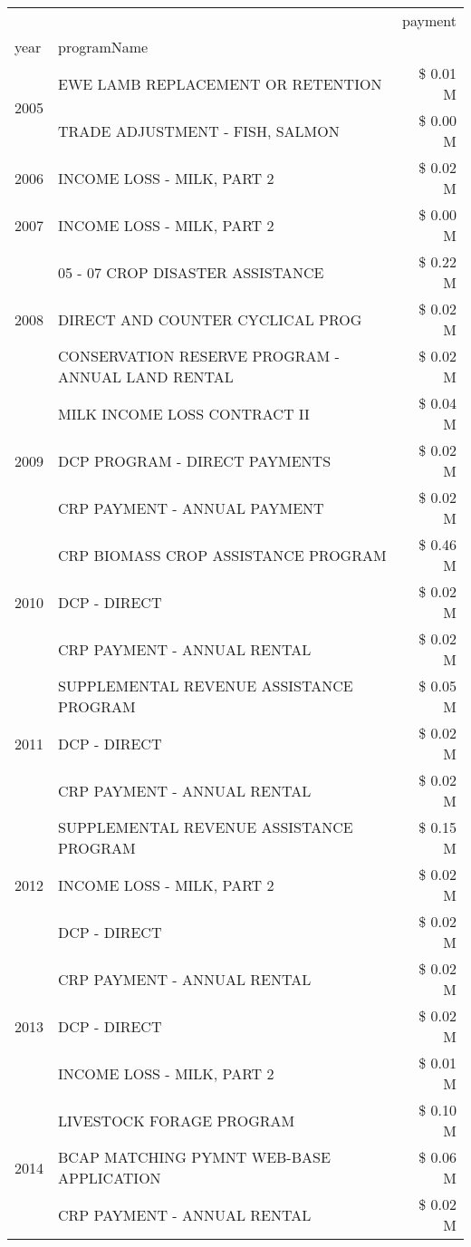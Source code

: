 \begin{tabular}{llr}
\toprule
 &  & payment \\
year & programName &  \\
\midrule
\multirow[t]{2}{*}{2005} & EWE LAMB REPLACEMENT OR RETENTION & \$ 0.01 M \\
 & TRADE ADJUSTMENT - FISH, SALMON & \$ 0.00 M \\
\cline{1-3}
2006 & INCOME LOSS - MILK, PART 2 & \$ 0.02 M \\
\cline{1-3}
2007 & INCOME LOSS - MILK, PART 2 & \$ 0.00 M \\
\cline{1-3}
\multirow[t]{3}{*}{2008} & 05 - 07 CROP DISASTER ASSISTANCE & \$ 0.22 M \\
 & DIRECT AND COUNTER CYCLICAL PROG & \$ 0.02 M \\
 & CONSERVATION RESERVE PROGRAM - ANNUAL LAND RENTAL & \$ 0.02 M \\
\cline{1-3}
\multirow[t]{3}{*}{2009} & MILK INCOME LOSS CONTRACT II & \$ 0.04 M \\
 & DCP PROGRAM - DIRECT PAYMENTS & \$ 0.02 M \\
 & CRP PAYMENT - ANNUAL PAYMENT & \$ 0.02 M \\
\cline{1-3}
\multirow[t]{3}{*}{2010} & CRP BIOMASS CROP ASSISTANCE PROGRAM & \$ 0.46 M \\
 & DCP - DIRECT & \$ 0.02 M \\
 & CRP PAYMENT - ANNUAL RENTAL & \$ 0.02 M \\
\cline{1-3}
\multirow[t]{3}{*}{2011} & SUPPLEMENTAL REVENUE ASSISTANCE PROGRAM & \$ 0.05 M \\
 & DCP - DIRECT & \$ 0.02 M \\
 & CRP PAYMENT - ANNUAL RENTAL & \$ 0.02 M \\
\cline{1-3}
\multirow[t]{3}{*}{2012} & SUPPLEMENTAL REVENUE ASSISTANCE PROGRAM & \$ 0.15 M \\
 & INCOME LOSS - MILK, PART 2 & \$ 0.02 M \\
 & DCP - DIRECT & \$ 0.02 M \\
\cline{1-3}
\multirow[t]{3}{*}{2013} & CRP PAYMENT - ANNUAL RENTAL & \$ 0.02 M \\
 & DCP - DIRECT & \$ 0.02 M \\
 & INCOME LOSS - MILK, PART 2 & \$ 0.01 M \\
\cline{1-3}
\multirow[t]{3}{*}{2014} & LIVESTOCK FORAGE PROGRAM & \$ 0.10 M \\
 & BCAP MATCHING PYMNT WEB-BASE APPLICATION & \$ 0.06 M \\
 & CRP PAYMENT - ANNUAL RENTAL & \$ 0.02 M \\

\end{tabular}
